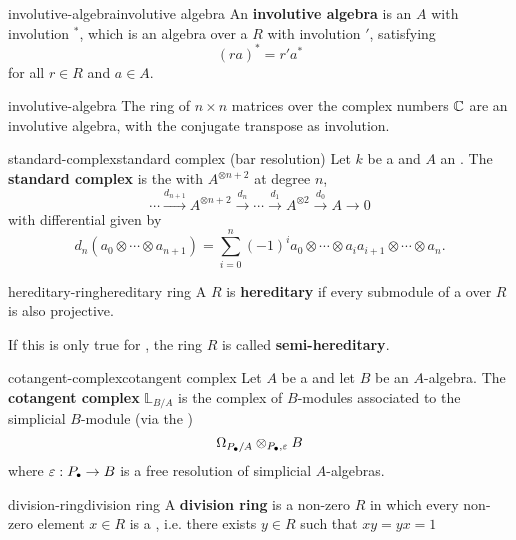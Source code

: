 \begin{topic}{involutive-algebra}{involutive algebra}
    An \textbf{involutive algebra} is an  $A$ with involution $^*$, which is an algebra over a  $R$ with involution $'$, satisfying
    \[ (ra)^* = r' a^* \]
    for all $r \in R$ and $a \in A$.
\end{topic}

\begin{example}{involutive-algebra}
    The ring of $n \times n$ matrices over the complex numbers $\mathbb{C}$ are an involutive algebra, with the conjugate transpose as involution.
\end{example}

\begin{topic}{standard-complex}{standard complex (bar resolution)}
    Let $k$ be a  and $A$ an . The \textbf{standard complex} is the  with $A^{\otimes n + 2}$ at degree $n$,
    \[ \cdots \xrightarrow{d_{n + 1}} A^{\otimes n + 2} \xrightarrow{d_n} \cdots \xrightarrow{d_1} A^{\otimes 2} \xrightarrow{d_0} A \to 0 \]
    with differential given by
    \[ d_n(a_0 \otimes \cdots \otimes a_{n + 1}) = \sum_{i = 0}^{n} (-1)^i a_0 \otimes \cdots \otimes a_i a_{i + 1} \otimes \cdots \otimes a_n . \]
\end{topic}

\begin{topic}{hereditary-ring}{hereditary ring}
    A  $R$ is \textbf{hereditary} if every submodule of a  over $R$ is also projective.
    
    If this is only true for , the ring $R$ is called \textbf{semi-hereditary}.
\end{topic}

\begin{topic}{cotangent-complex}{cotangent complex}
    Let $A$ be a  and let $B$ be an $A$-algebra. The \textbf{cotangent complex} $\mathbb{L}_{B/A}$ is the complex of $B$-modules associated to the simplicial $B$-module (via the )
    \[ \Omega_{P_\bdot/A} \otimes_{P_\bdot, \varepsilon} B \]
    where $\varepsilon : P_\bdot \to B$ is a free resolution of simplicial $A$-algebras.
\end{topic}

\begin{topic}{division-ring}{division ring}
    A \textbf{division ring} is a non-zero  $R$ in which every non-zero element $x \in R$ is a , i.e. there exists $y \in R$ such that $xy = yx = 1$
\end{topic}

